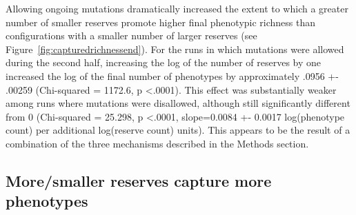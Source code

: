 \documentclass[letterpaper]{article}
\begin{document}
Allowing ongoing mutations dramatically increased the extent to which a greater number of smaller reserves promote higher final phenotypic richness than configurations with a smaller number of larger reserves (see Figure~\ref{fig:capturedrichnessend}).  For the runs in which mutations were allowed during the second half, increasing the log of the number of reserves by one increased the log of the final number of phenotypes by approximately .0956 +- .00259 (Chi-squared = 1172.6, p \textless .0001). This effect was substantially weaker among runs where mutations were disallowed, although still significantly different from 0 (Chi-squared = 25.298, p \textless .0001, slope=0.0084 +- 0.0017 log(phenotype count) per additional log(reserve count) units). This appears to be the result of a combination of the three mechanisms described in the Methods section.
%
%
%
%
%
%
%
%


\subsection{More/smaller reserves capture more phenotypes}
\end{document}
